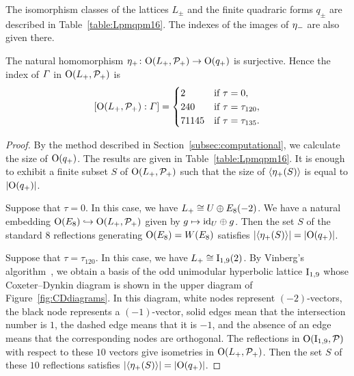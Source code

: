 \documentclass{amsart} %
\begin{document}
%
The isomorphism classes of the lattices $L_{\pm}$ and 
the finite quadraric forms $q_{\pm}$ are described in Table~\ref{table:Lpmqpm16}.
The indexes of the images of ${\eta}_{-}$ are also given there.
%
\begin{proposition}\label{prop:etaplussurj16}
The natural homomorphism ${\eta}_{+}\colon \mathord{\mathrm{O}}(L_{+}, \mathord{\mathcal{P}}_{+})\to \mathord{\mathrm{O}}(q_{+})$ is surjective.
Hence the index of $\varGamma$ in $\mathord{\mathrm{O}}(L_{+}, \mathord{\mathcal{P}}_{+})$ is
\[
[\mathord{\mathrm{O}}(L_{+}, \mathord{\mathcal{P}}_{+}): \varGamma]=
\begin{cases}
2 & \textrm{if $\tau=0$}, \\
240 & \textrm{if $\tau=\tau_{120}$}, \\
71145 & \textrm{if $\tau=\tau_{135}$}.
\end{cases}
\]
\end{proposition}
%
\begin{proof}
By the method described in Section~\ref{subsec:computational},
we calculate the size of $\mathord{\mathrm{O}}(q_{+})$.
The results are given in Table~\ref{table:Lpmqpm16}.
It is enough to exhibit a finite subset $S$ 
of $\mathord{\mathrm{O}}(L_{+}, \mathord{\mathcal{P}}_{+})$ such that 
the size of $\langle {{\eta}_{+}(S)} \rangle$ is equal to $|\mathord{\mathrm{O}}(q_{+})|$.
\par
Suppose that $\tau=0$.
In this case,
we have $L_{+}\cong U\oplus E_8(-2)$.
We have a natural embedding $\mathord{\mathrm{O}}(E_8)\hookrightarrow \mathord{\mathrm{O}}(L_{+}, \mathord{\mathcal{P}}_{+})$
given by $g\mapsto \mathord{\mathrm{id}}_U \oplus g$.
Then %
the set $S$ of the standard $8$ reflections generating $\mathord{\mathrm{O}}(E_8)=W(E_8)$ 
satisfies $|\langle {{\eta}_{+}(S)} \rangle|=|\mathord{\mathrm{O}}(q_{+})|$.
%
\par
Suppose that $\tau=\tau_{120}$.
In this case,
we have $L_{+}\cong \mathrm{I}_{1, 9}(2)$.
By Vinberg’s algorithm~\cite{Vinberg1985}, 
we obtain a basis of the odd unimodular hyperbolic lattice $\mathrm{I}_{1,9}$ 
whose Coxeter–Dynkin diagram is shown in the upper diagram of Figure~\ref{fig:CDdiagrams}. 
In this diagram, 
white nodes represent $(-2)$-vectors, 
the black node represents a $(-1)$-vector,
solid edges mean that the intersection number is $1$, 
the dashed edge means that it is $-1$, 
and the absence of an edge means that the corresponding nodes are orthogonal.
The reflections in $\mathord{\mathrm{O}}(\mathrm{I}_{1,9}, \mathord{\mathcal{P}})$
with respect to these $10$ vectors
give isometries in $\mathord{\mathrm{O}}(L_{+}, \mathord{\mathcal{P}}_{+})$.
Then the set $S$ of these $10$ reflections
satisfies $|\langle {{\eta}_{+}(S)} \rangle|=|\mathord{\mathrm{O}}(q_{+})|$.

\end{proof}
\end{document}
